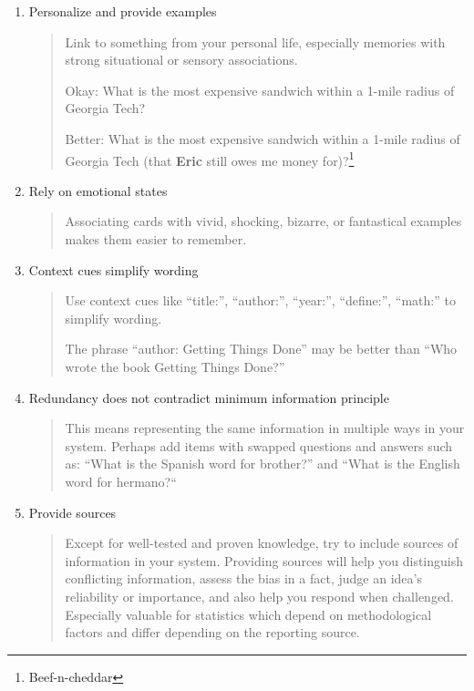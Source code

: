\documentclass[]{tufte-handout}
\begin{document}
\begin{enumerate}
\item{Personalize and provide examples}

\begin{quote}
Link to something from your personal life, especially memories with strong situational or sensory associations.

Okay: What is the most expensive sandwich within a 1-mile radius of Georgia Tech?

Better: What is the most expensive sandwich within a 1-mile radius of Georgia Tech (that \textbf{Eric} still owes me money for)?\footnote{Beef-n-cheddar}
\end{quote}

\item{Rely on emotional states}

\begin{quote}
Associating cards with vivid, shocking, bizarre, or fantastical examples makes them easier to remember.
\end{quote}

\item{Context cues simplify wording}

\begin{quote}
Use context cues like ``title:'', ``author:'', ``year:'', ``define:'', ``math:'' to simplify wording.

The phrase ``author: Getting Things Done'' may be better than ``Who wrote the book Getting Things Done?''
\end{quote}

\item{Redundancy does not contradict minimum information principle}

\begin{quote}
This means representing the same information in multiple ways in your system. Perhaps add items with swapped questions and answers such as: ``What is the Spanish word for brother?'' and ``What is the English word for hermano?``
\end{quote}

\item{Provide sources}

\begin{quote}
Except for well-tested and proven knowledge, try to include sources of information in your system. Providing sources will help you distinguish conflicting information, assess the bias in a fact, judge an idea's reliability or importance, and also help you respond when challenged. Especially valuable for statistics which depend on methodological factors and differ depending on the reporting source.


\end{quote}
\end{enumerate}
\end{document}
